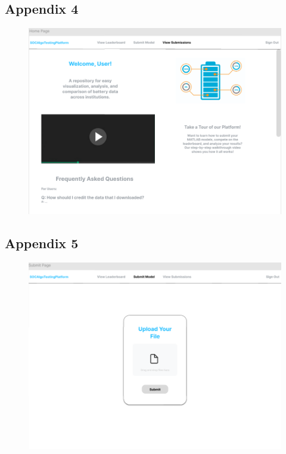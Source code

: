 \documentclass[12pt, titlepage]{article}
\begin{document}
\subsection{Appendix 4} \label{Appendix 4}
\begin{figure}[H]
    \centering
    \includegraphics[width=1\linewidth]{Interface/Home.png}
\end{figure}
\subsection{Appendix 5} \label{Appendix 5}
\begin{figure}[H]
    \centering
    \includegraphics[width=1\linewidth]{Design/SoftArchitecture/Interface/Submit.png}
\end{figure}
\end{document}

